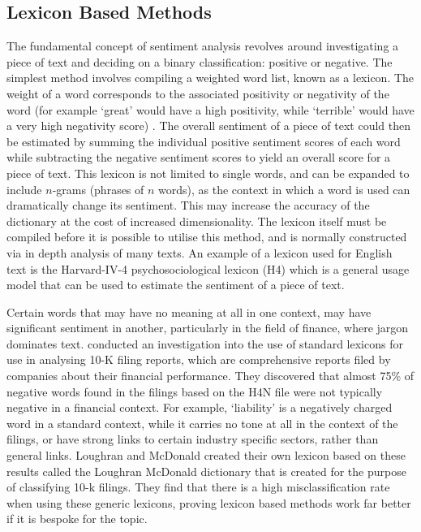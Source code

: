 \subsection{Lexicon Based Methods}
The fundamental concept of sentiment analysis revolves around investigating a piece of text and deciding on a binary classification: positive or negative. The simplest method involves compiling a weighted word list, known as a lexicon. The weight of a word corresponds to the associated positivity or negativity of the word (for example `great' would have a high positivity, while `terrible' would have a very high negativity score) \parencite{taboada2011lexicon}. The overall sentiment of a piece of text could then be estimated by summing the individual positive sentiment scores of each word while subtracting the negative sentiment scores to yield an overall score for a piece of text. This lexicon is not limited to single words, and can be expanded to include $n$-grams (phrases of $n$ words), as the context in which a word is used can dramatically change its sentiment. This may increase the accuracy of the dictionary at the cost of increased dimensionality. The lexicon itself must be compiled before it is possible to utilise this method, and is normally constructed via in depth analysis of many texts. An example of a lexicon used for English text is the Harvard-IV-4 psychosociological lexicon (H4) which is a general usage model that can be used to estimate the sentiment of a piece of text.

Certain words that may have no meaning at all in one context, may have significant sentiment in another, particularly in the field of finance, where jargon dominates text. \textcite{lm-dict} conducted an investigation into the use of standard lexicons for use in analysing 10-K filing reports, which are comprehensive reports filed by companies about their financial performance. They discovered that almost 75\% of negative words found in the filings based on the H4N file were not typically negative in a financial context. For example, `liability' is a negatively charged word in a standard context, while it carries no tone at all in the context of the filings, or have strong links to certain industry specific sectors, rather than general links. Loughran and McDonald created their own lexicon based on these results called the Loughran McDonald dictionary that is created for the purpose of classifying 10-k filings. They find that there is a high misclassification rate when using these generic lexicons, proving lexicon based methods work far better if it is bespoke for the topic. 

